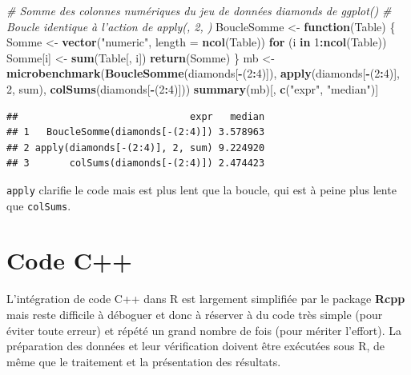 \documentclass[
  12pt,
  french,
  a4paper,
  extrafontsizes,onecolumn,openright
  ]{memoir}
\newenvironment{Shaded}{\begin{snugshade}}{\end{snugshade}}
\newcommand{\CommentTok}[1]{\textcolor[rgb]{0.56,0.35,0.01}{\textit{#1}}}
\newcommand{\ControlFlowTok}[1]{\textcolor[rgb]{0.13,0.29,0.53}{\textbf{#1}}}
\newcommand{\DataTypeTok}[1]{\textcolor[rgb]{0.13,0.29,0.53}{#1}}
\newcommand{\DecValTok}[1]{\textcolor[rgb]{0.00,0.00,0.81}{#1}}
\newcommand{\KeywordTok}[1]{\textcolor[rgb]{0.13,0.29,0.53}{\textbf{#1}}}
\newcommand{\NormalTok}[1]{#1}
\newcommand{\OperatorTok}[1]{\textcolor[rgb]{0.81,0.36,0.00}{\textbf{#1}}}
\newcommand{\StringTok}[1]{\textcolor[rgb]{0.31,0.60,0.02}{#1}}
\begin{document}
\begin{Shaded}
\begin{Highlighting}[]
\CommentTok{# Somme des colonnes numériques du jeu de données diamonds de ggplot()}
\CommentTok{# Boucle identique à l'action de apply(, 2, )}
\NormalTok{BoucleSomme <-}\StringTok{ }\ControlFlowTok{function}\NormalTok{(Table) \{}
\NormalTok{  Somme <-}\StringTok{ }\KeywordTok{vector}\NormalTok{(}\StringTok{"numeric"}\NormalTok{, }\DataTypeTok{length =} \KeywordTok{ncol}\NormalTok{(Table))}
  \ControlFlowTok{for}\NormalTok{ (i }\ControlFlowTok{in} \DecValTok{1}\OperatorTok{:}\KeywordTok{ncol}\NormalTok{(Table)) Somme[i] <-}\StringTok{ }\KeywordTok{sum}\NormalTok{(Table[, i])}
  \KeywordTok{return}\NormalTok{(Somme)}
\NormalTok{\}}
\NormalTok{mb <-}\StringTok{ }\KeywordTok{microbenchmark}\NormalTok{(}\KeywordTok{BoucleSomme}\NormalTok{(diamonds[}\OperatorTok{-}\NormalTok{(}\DecValTok{2}\OperatorTok{:}\DecValTok{4}\NormalTok{)]), }
                     \KeywordTok{apply}\NormalTok{(diamonds[}\OperatorTok{-}\NormalTok{(}\DecValTok{2}\OperatorTok{:}\DecValTok{4}\NormalTok{)], }\DecValTok{2}\NormalTok{, sum), }
                     \KeywordTok{colSums}\NormalTok{(diamonds[}\OperatorTok{-}\NormalTok{(}\DecValTok{2}\OperatorTok{:}\DecValTok{4}\NormalTok{)]))}
\KeywordTok{summary}\NormalTok{(mb)[, }\KeywordTok{c}\NormalTok{(}\StringTok{"expr"}\NormalTok{, }\StringTok{"median"}\NormalTok{)]}
\end{Highlighting}
\end{Shaded}

\begin{verbatim}
##                              expr   median
## 1   BoucleSomme(diamonds[-(2:4)]) 3.578963
## 2 apply(diamonds[-(2:4)], 2, sum) 9.224920
## 3       colSums(diamonds[-(2:4)]) 2.474423
\end{verbatim}

\normalsize

\texttt{apply} clarifie le code mais est plus lent que la boucle, qui est à peine plus lente que \texttt{colSums}.

\hypertarget{sec:cpp}{%
\section{Code C++}\label{sec:cpp}}

L'intégration de code C++ dans R est largement simplifiée par le package \textbf{Rcpp} mais reste difficile à déboguer et donc à réserver à du code très simple (pour éviter toute erreur) et répété un grand nombre de fois (pour mériter l'effort).
La préparation des données et leur vérification doivent être exécutées sous R, de même que le traitement et la présentation des résultats.
\end{document}
